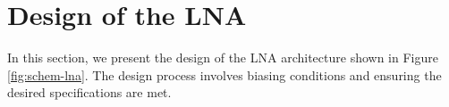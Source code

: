 \section{Design of the LNA}

In this section, we present the design of the LNA architecture shown in Figure \ref{fig:schem-lna}. The design process involves biasing conditions and ensuring the desired specifications are met.
